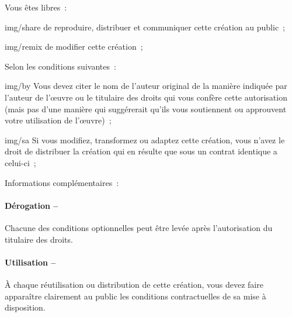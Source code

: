 {  %
  \begin{lblock}{Vous êtes libres~:}

    \begin{pictonote}{img/share}
      de reproduire, distribuer et communiquer cette création au
      public~;
    \end{pictonote}

    \begin{pictonote}{img/remix}
      de modifier cette création~;
    \end{pictonote}

  \end{lblock}
  \begin{lblock}{Selon les conditions suivantes~:}

    \begin{pictonote}{img/by}
       Vous devez citer le nom de l'auteur
      original de la manière indiquée par l'auteur de l'œuvre ou le
      titulaire des droits qui vous confère cette autorisation (mais pas
      d'une manière qui suggérerait qu'ils vous soutiennent ou
      approuvent votre utilisation de l'œuvre)~;
    \end{pictonote}

    \begin{pictonote}{img/sa}
       Si
      vous modifiez, transformez ou adaptez cette création, vous n'avez
      le droit de distribuer la création qui en résulte que sous un
      contrat identique a celui-ci~;
    \end{pictonote}

  \end{lblock}
  \clearpage
  \begin{lblock}{Informations complémentaires~:}

    \hspace{0.4cm}
    \parbox{0.7\textwidth}{
      \paragraph{Dérogation --}
      Chacune des conditions optionnelles peut être levée après
      l'autorisation du titulaire des droits.

      \paragraph{Utilisation --}
      À chaque réutilisation ou distribution de cette création, vous
      devez faire apparaître clairement au public les conditions
      contractuelles de sa mise à disposition.

}
\end{lblock}}
